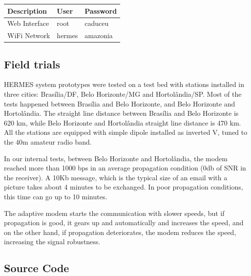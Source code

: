 \begin{table}[h]

\centering
\begin{tabular}{|l|l|l|}
\hline
Description & User & Password  \\ \hline
Web Interface & root  & caduceu \\  \hline
WiFi Network & hermes & amazonia \\ \hline
\end{tabular}
\end{table}

\subsection{Field trials}
\label{apx_field_trials}
    HERMES system prototypes were tested on a test bed with stations installed in three cities: Brasília/DF, Belo Horizonte/MG and Hortolândia/SP. Most of the tests happened between Brasília and Belo Horizonte, and Belo Horizonte and Hortolândia. The straight line distance between Brasília and Belo Horizonte is 620 km, while Belo Horizonte and Hortolândia straight line distance is 470 km. All the stations are equipped with simple dipole installed as inverted V, tuned to the 40m amateur radio band.

    In our internal tests, between Belo Horizonte and Hortolândia, the modem reached more than 1000 bps in an average propagation condition (0db of SNR in the receiver). A 10Kb message, which is the typical size of an email with a picture takes about 4 minutes to be exchanged. In poor propagation conditions, this time can go up to 10 minutes. 

    The adaptive modem starts the communication with slower speeds, but if propagation is good, it gears up and automatically and increases the speed, and on the other hand, if propagation deteriorates, the modem reduces the speed, increasing the signal robustness.

\subsection{Source Code}
\label{apx_src}

